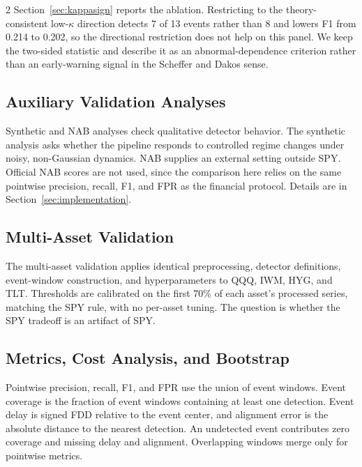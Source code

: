 \documentclass{book}
\begin{document}
\begin{multicols}{2}
Section~\ref{sec:kappasign} reports the ablation. Restricting to the theory-consistent low-$\kappa$ direction detects 7 of 13 events rather than 8 and lowers F1 from 0.214 to 0.202, so the directional restriction does not help on this panel. We keep the two-sided statistic and describe it as an abnormal-dependence criterion rather than an early-warning signal in the Scheffer and Dakos sense.

\subsection{Auxiliary Validation Analyses}
Synthetic and NAB analyses check qualitative detector behavior. The synthetic analysis asks whether the pipeline responds to controlled regime changes under noisy, non-Gaussian dynamics. NAB supplies an external setting outside SPY. Official NAB scores are not used, since the comparison here relies on the same pointwise precision, recall, F1, and FPR as the financial protocol. Details are in Section~\ref{sec:implementation}.

\subsection{Multi-Asset Validation}
The multi-asset validation applies identical preprocessing, detector definitions, event-window construction, and hyperparameters to QQQ, IWM, HYG, and TLT. Thresholds are calibrated on the first 70\% of each asset's processed series, matching the SPY rule, with no per-asset tuning. The question is whether the SPY tradeoff is an artifact of SPY.

\subsection{Metrics, Cost Analysis, and Bootstrap}
Pointwise precision, recall, F1, and FPR use the union of event windows. Event coverage is the fraction of event windows containing at least one detection. Event delay is signed FDD relative to the event center, and alignment error is the absolute distance to the nearest detection. An undetected event contributes zero coverage and missing delay and alignment. Overlapping windows merge only for pointwise metrics.


\end{multicols}
\end{document}
